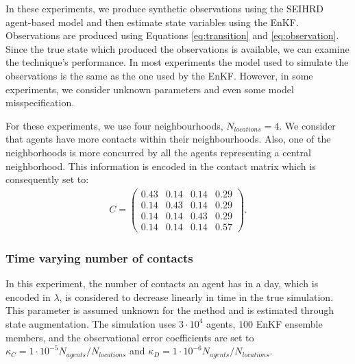 \documentclass[11pt,a4paper]{article}
\begin{document}
In these experiments, we produce synthetic observations using the SEIHRD agent-based model and then estimate state variables using the EnKF. Observations are produced using Equations \ref{eq:transition} and \ref{eq:observation}. Since the true state which produced the observations is available, we can examine the technique's performance. In most experiments the model used to simulate the observations is the same as the one used by the EnKF. However, in some experiments, we consider unknown parameters and even some model misspecification.

For these experiments, we use four neighbourhoods, $N_{locations} = 4$. We consider that agents have more contacts within their neighbourhoods. Also, one of the neighborhoods is more concurred by all the agents representing a central neighborhood. This information is encoded in the contact matrix which is consequently set to:
\begin{align*}
    C = 
    \begin{pmatrix}
        0.43 & 0.14 & 0.14 & 0.29 \\
        0.14 & 0.43 & 0.14 & 0.29 \\
        0.14 & 0.14 & 0.43 & 0.29 \\
        0.14 & 0.14 & 0.14 & 0.57 
    \end{pmatrix}.
\end{align*}

\subsubsection{Time varying number of contacts} \label{sec:varying_lambda_exp}

In this experiment, the number of contacts an agent has in a day, which is encoded in $\lambda$, is considered to decrease  linearly in time in the true simulation. This parameter is assumed unknown for the method and is estimated through state augmentation. The simulation uses $3\cdot 10^4$ agents, $100$ EnKF ensemble members, and the observational error coefficients are set to $\kappa_{C} = 1 \cdot 10^{-5} N_{agents}/N_{locations}$ and $\kappa_{D} = 1 \cdot 10^{-6} N_{agents}/N_{locations}$. 
\end{document}
